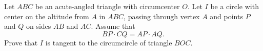 Let $ABC$ be an acute-angled triangle with circumcenter $O$. Let $I$ be a circle with center on the altitude from $A$ in $ABC$,  passing through vertex $A$ and points $P$ and $Q$ on sides $AB$ and $AC$. Assume that\[BP\cdot CQ = AP\cdot AQ.\]Prove that $I$ is tangent to the circumcircle of triangle $BOC$.